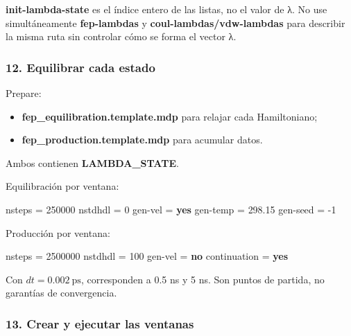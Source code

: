 \documentclass[
  spanish,
  11pt,
  a4paper]{article}
\newenvironment{Shaded}{\begin{snugshade}}{\end{snugshade}}
\newcommand{\DataTypeTok}[1]{\textcolor[rgb]{0.13,0.29,0.53}{#1}}
\newcommand{\DecValTok}[1]{\textcolor[rgb]{0.00,0.00,0.81}{#1}}
\newcommand{\FloatTok}[1]{\textcolor[rgb]{0.00,0.00,0.81}{#1}}
\newcommand{\KeywordTok}[1]{\textcolor[rgb]{0.13,0.29,0.53}{\textbf{#1}}}
\newcommand{\OtherTok}[1]{\textcolor[rgb]{0.56,0.35,0.01}{#1}}
\newcommand{\StringTok}[1]{\textcolor[rgb]{0.31,0.60,0.02}{#1}}
\providecommand{\tightlist}{%
  \setlength{\itemsep}{0pt}\setlength{\parskip}{0pt}}
\begin{document}
\textbf{init-lambda-state} es el índice entero de las listas, no el
valor de λ. No use simultáneamente \textbf{fep-lambdas} y
\textbf{coul-lambdas/vdw-lambdas} para describir la misma ruta sin
controlar cómo se forma el vector λ.

\subsubsection{12. Equilibrar cada estado}\label{equilibrar-cada-estado}

Prepare:

\begin{itemize}
\tightlist
\item
  \textbf{fep\_equilibration.template.mdp} para relajar cada
  Hamiltoniano;
\item
  \textbf{fep\_production.template.mdp} para acumular datos.
\end{itemize}

Ambos contienen \textbf{LAMBDA\_STATE}.

Equilibración por ventana:

\begin{Shaded}
\begin{Highlighting}[]
\DataTypeTok{nsteps       }\OtherTok{=}\StringTok{ }\DecValTok{250000}
\DataTypeTok{nstdhdl      }\OtherTok{=}\StringTok{ }\DecValTok{0}
\DataTypeTok{gen{-}vel      }\OtherTok{=}\StringTok{ }\KeywordTok{yes}
\DataTypeTok{gen{-}temp     }\OtherTok{=}\StringTok{ }\FloatTok{298.15}
\DataTypeTok{gen{-}seed     }\OtherTok{=}\StringTok{ }\DecValTok{{-}1}
\end{Highlighting}
\end{Shaded}

Producción por ventana:

\begin{Shaded}
\begin{Highlighting}[]
\DataTypeTok{nsteps       }\OtherTok{=}\StringTok{ }\DecValTok{2500000}
\DataTypeTok{nstdhdl      }\OtherTok{=}\StringTok{ }\DecValTok{100}
\DataTypeTok{gen{-}vel      }\OtherTok{=}\StringTok{ }\KeywordTok{no}
\DataTypeTok{continuation }\OtherTok{=}\StringTok{ }\KeywordTok{yes}
\end{Highlighting}
\end{Shaded}

Con \(dt=0.002\ \mathrm{ps}\), corresponden a 0.5 ns y 5 ns. Son puntos
de partida, no garantías de convergencia.

\subsubsection{13. Crear y ejecutar las
ventanas}\label{crear-y-ejecutar-las-ventanas}
\end{document}
